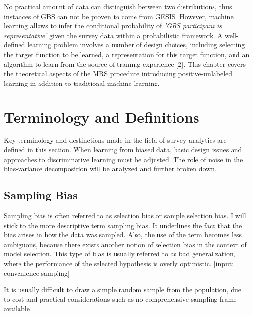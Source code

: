 
No practical amount of data can distinguish between two distributions, thus instances of GBS can not be proven to come from GESIS. However, machine learning allows to infer the conditional probability of \textit{'GBS participant is representative'} given the survey data within a probabilistic framework. A well-defined learning problem involves a number of design choices, including selecting the target function to be learned, a representation for this target function, and an algorithm to learn from the source of training experience [2]. This chapter covers the theoretical aspects of the MRS procedure introducing positive-unlabeled learning in addition to traditional machine learning.

\section{Terminology and Definitions}

Key terminology and destinctions made in the field of survey analytics are defined in this section. When learning from biased data, basic design issues and approaches to discriminative learning must be adjusted. The role of noise in the bias-variance decomposition will be analyzed and further broken down.

\subsection{Sampling Bias}

Sampling bias is often referred to as selection bias or sample selection bias. I will stick to the more descriptive term sampling bias. It underlines the fact that the bias arises in how the data was sampled. Also, the use of the term becomes less ambiguous, because there exists another notion of selection bias in the context of model selection. This type of bias is usually referred to as bad generalization, where the performance of the selected hypothesis is overly optimistic. [input: convenience sampling]

It is usually difficult to draw a simple random sample from the population, due to cost and practical considerations such as no comprehensive sampling frame available

